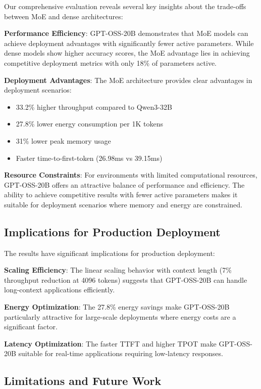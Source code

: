 \documentclass[11pt]{article}
\begin{document}
Our comprehensive evaluation reveals several key insights about the trade-offs between MoE and dense architectures:

\textbf{Performance Efficiency}: GPT-OSS-20B demonstrates that MoE models can achieve deployment advantages with significantly fewer active parameters. While dense models show higher accuracy scores, the MoE advantage lies in achieving competitive deployment metrics with only 18\% of parameters active.

\textbf{Deployment Advantages}: The MoE architecture provides clear advantages in deployment scenarios:
\begin{itemize}
    \item 33.2\% higher throughput compared to Qwen3-32B
    \item 27.8\% lower energy consumption per 1K tokens
    \item 31\% lower peak memory usage
    \item Faster time-to-first-token (26.98ms vs 39.15ms)
\end{itemize}

\textbf{Resource Constraints}: For environments with limited computational resources, GPT-OSS-20B offers an attractive balance of performance and efficiency. The ability to achieve competitive results with fewer active parameters makes it suitable for deployment scenarios where memory and energy are constrained.

\subsection{Implications for Production Deployment}

The results have significant implications for production deployment:

\textbf{Scaling Efficiency}: The linear scaling behavior with context length (7\% throughput reduction at 4096 tokens) suggests that GPT-OSS-20B can handle long-context applications efficiently.

\textbf{Energy Optimization}: The 27.8\% energy savings make GPT-OSS-20B particularly attractive for large-scale deployments where energy costs are a significant factor.

\textbf{Latency Optimization}: The faster TTFT and higher TPOT make GPT-OSS-20B suitable for real-time applications requiring low-latency responses.

\subsection{Limitations and Future Work}
\end{document}

